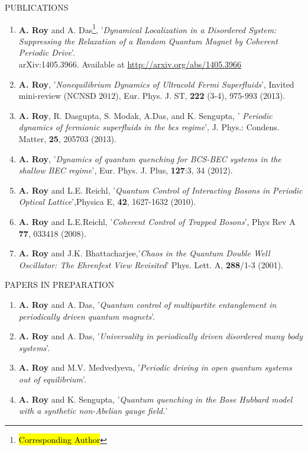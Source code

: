 \documentclass[a4paper,11pt]{article}
\begin{document}
\begin{CVstuff}{PUBLICATIONS}
\end{CVstuff}
\begin{enumerate}
\item
\textbf{A. Roy} and A. Das\footnote{\large{\hl{Corresponding Author}}}, '\textit{Dynamical Localization in a Disordered System: Suppressing the Relaxation of a 
Random Quantum Magnet by Coherent Periodic Drive}'.\\
arXiv:1405.3966. Available at \url{http://arxiv.org/abs/1405.3966}
\item
\textbf{A. Roy}\footnotemark[\value{footnote}], '\textit{Nonequilibrium Dynamics of Ultracold Fermi Superfluids}', Invited mini-review (NCNSD $2012$),
Eur. Phys. J. ST, {\bf 222} (3-4), 975-993 (2013).
\item
\textbf{A. Roy}\footnotemark[\value{footnote}] , R. Dasgupta, S. Modak, A.Das, and K. Sengupta, '\textit{ Periodic dynamics of fermionic superfluids in the bcs regime}',  J. Phys.: Condens. Matter, {\bf 25}, 205703 (2013).
\item
\textbf{A. Roy}\footnotemark[\value{footnote}] , '\textit{Dynamics of quantum quenching for BCS-BEC systems in the shallow BEC regime}', Eur. Phys. J. {Plus}, {\bf 127}:3, 34 (2012).
 \item 
\textbf{A. Roy} and L.E. Reichl\footnotemark[\value{footnote}], '\textit{Quantum Control  of Interacting Bosons in Periodic Optical Lattice}',Physica {E}, {\bf 42}, 1627-1632 (2010).
\item
\textbf{A. Roy} and L.E.Reichl\footnotemark[\value{footnote}], '\textit{Coherent Control of Trapped Bosons}', Phys Rev {A} {\bf 77}, 033418 (2008).
\item
\textbf{A. Roy} and J.K. Bhattacharjee\footnotemark[\value{footnote}],'\textit{Chaos in the Quantum Double Well Oscillator: The Ehrenfest View Revisited}' Phys. Lett. {A}, {\bf 288}/1-3 (2001).
\end{enumerate}

\pagebreak

\begin{CVstuff}{PAPERS IN PREPARATION}
\end{CVstuff}
\begin{enumerate}
\item
\textbf{A. Roy} and A. Das, '\textit{Quantum control of multipartite entanglement in periodically driven quantum magnets}'.
\item
\textbf{A. Roy} and A. Das, '\textit{Universality in periodically driven disordered many body systems}'.
\item
\textbf{A. Roy} and M.V. Medvedyeva, '\textit{Periodic driving in open quantum systems out of equilibrium}'.
\item
\textbf{A. Roy} and K. Sengupta, '\textit{Quantum quenching in the Bose Hubbard model with a synthetic non-Abelian gauge field.}'
\end{enumerate}
 
\end{document}
